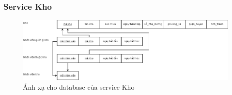 \subsubsection{Service Kho}
\begin{figure}[!htp]
    \begin{center}
        \includegraphics[width=1\textwidth]{img/database/mapping/mapping-kho.png}
        \newline
        \caption{Ánh xạ cho database của service Kho}
    \end{center}
\end{figure}